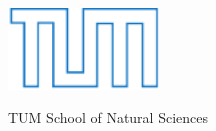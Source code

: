 \documentclass[12pt,twoside]{article}
\begin{document}
\newpage\null\thispagestyle{empty}\newpage

\thispagestyle{empty}
\begin{center}
  \includegraphics[width=0.3\textwidth]{Figures/TUMLogo_oZ_Outline_blau_CMYK-eps-converted-to.pdf}
  
  \vspace{3mm}
  \huge TUM School of Natural Sciences
  \vspace{3mm}  
  
\end{center}
\end{document}
